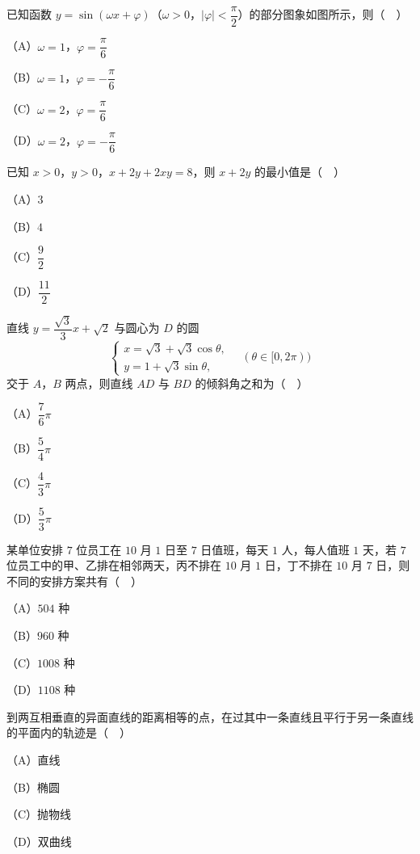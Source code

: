 \begingroup
\renewenvironment{question}{\Needspace{0.5\textheight}}{}
\begin{question}
已知函数 $y=\sin(\omega x+\varphi)$（$\omega>0$，$|\varphi|<\dfrac{\pi}{2}$）的部分图象如图所示，则（　）

（A）$\omega=1$，$\varphi=\dfrac{\pi}{6}$

（B）$\omega=1$，$\varphi=-\dfrac{\pi}{6}$

（C）$\omega=2$，$\varphi=\dfrac{\pi}{6}$

（D）$\omega=2$，$\varphi=-\dfrac{\pi}{6}$
\nopagebreak[4]
\begin{center}\end{center}
\nopagebreak[4]
\end{question}
\endgroup
\begin{question}
已知 $x>0$，$y>0$，$x+2y+2xy=8$，则 $x+2y$ 的最小值是（　）

（A）$3$

（B）$4$

（C）$\dfrac92$

（D）$\dfrac{11}{2}$

\end{question}
\begin{question}
直线 $y=\dfrac{\sqrt3}{3}x+\sqrt2$ 与圆心为 $D$ 的圆
\nopagebreak[4]
\[\begin{cases}x=\sqrt3+\sqrt3\cos\theta,\\y=1+\sqrt3\sin\theta,\end{cases}\quad(\theta\in[0,2\pi))\]
交于 $A$，$B$ 两点，则直线 $AD$ 与 $BD$ 的倾斜角之和为（　）

（A）$\dfrac76\pi$

（B）$\dfrac54\pi$

（C）$\dfrac43\pi$

（D）$\dfrac53\pi$

\end{question}
\begin{question}
某单位安排 $7$ 位员工在 $10$ 月 $1$ 日至 $7$ 日值班，每天 $1$ 人，每人值班 $1$ 天，若 $7$ 位员工中的甲、乙排在相邻两天，丙不排在 $10$ 月 $1$ 日，丁不排在 $10$ 月 $7$ 日，则不同的安排方案共有（　）

（A）$504$ 种

（B）$960$ 种

（C）$1008$ 种

（D）$1108$ 种

\end{question}
\begin{question}
到两互相垂直的异面直线的距离相等的点，在过其中一条直线且平行于另一条直线的平面内的轨迹是（　）

（A）直线

（B）椭圆

（C）抛物线

（D）双曲线

\end{question}
